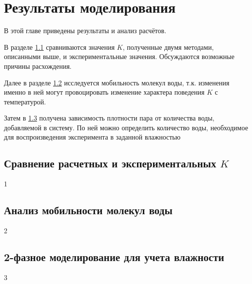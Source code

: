 \chapter{Результаты моделирования}
\label{Sec:Results}

В этой главе приведены результаты и анализ расчётов.

В разделе \ref{Subsec:ResKcompar} сравниваются значения $K$, полученные двумя методами, описанными выше, и экспериментальные значения. Обсуждаются возможные причины расхождения.

Далее в разделе \ref{Subsec:ResWaterMob} исследуется мобильность молекул воды, т.к. изменения именно в ней могут провоцировать изменение характера поведения $K$ с температурой.

Затем в \ref{Subsec:ResWater2phase} получена зависимость плотности пара от количества воды, добавляемой в систему. По ней можно определить количество воды, необходимое для воспроизведения эксперимента в заданной влажностью


\section{Сравнение расчетных и экспериментальных $K$}
\label{Subsec:ResKcompar}

1

\section{Анализ мобильности молекул воды}
\label{Subsec:ResWaterMob}

2

\section{2-фазное моделирование для учета влажности}
\label{Subsec:ResWater2phase}

3

